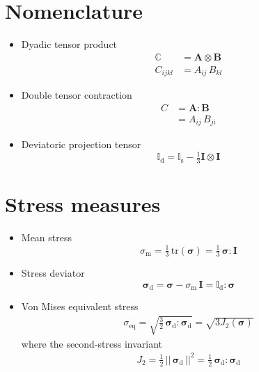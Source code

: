 \documentclass[times,namecite]{goose-article}
\begin{document}
\appendix
\vfill\newpage

\section{Nomenclature}
\label{sec:nomenclature}

\begin{itemize}
%
\item Dyadic tensor product
\begin{align}
  \mathbb{C} &= \bm{A} \otimes \bm{B} \\
  C_{ijkl}   &= A_{ij} \,      B_{kl}
\end{align}
%
\item Double tensor contraction
\begin{align}
  C &= \bm{A} : \bm{B} \\
    &= A_{ij} \, B_{ji}
\end{align}
%
\item Deviatoric projection tensor
%
\begin{equation}
  \mathbb{I}_\mathrm{d}
  = \mathbb{I}_\mathrm{s} - \tfrac{1}{3} \bm{I} \otimes \bm{I}
\end{equation}
%
\end{itemize}

\section{Stress measures}
\label{sec:ap:stress}

\begin{itemize}
%
\item Mean stress
%
\begin{equation}
\sigma_\mathrm{m}
= \tfrac{1}{3} \, \mathrm{tr} ( \bm{\sigma} )
= \tfrac{1}{3} \, \bm{\sigma} : \bm{I}
\end{equation}
%
\item Stress deviator
%
\begin{equation}
  \bm{\sigma}_\mathrm{d}
  = \bm{\sigma} - \sigma_\mathrm{m} \, \bm{I}
  = \mathbb{I}_\mathrm{d} : \bm{\sigma}
\end{equation}
%
\item Von Mises equivalent stress
\begin{align}
\sigma_\mathrm{eq}
= \sqrt{ \tfrac{3}{2} \, \bm{\sigma}_\mathrm{d} : \bm{\sigma}_\mathrm{d} }
= \sqrt{ 3 J_2(\bm{\sigma}) }
\end{align}
where the second-stress invariant
\begin{align}
J_2 = \tfrac{1}{2} \, || \, \bm{\sigma}_\mathrm{d} \, ||^2
    = \tfrac{1}{2} \, \bm{\sigma}_\mathrm{d} : \bm{\sigma}_\mathrm{d}
\end{align}
%
\end{itemize}


\end{document}
